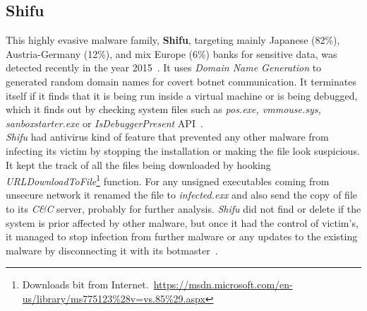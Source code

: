 \subsection{Shifu}
\label{sub:Shifu}
This highly evasive malware family, \textbf{Shifu}, targeting mainly Japanese (82\%), Austria-Germany (12\%), and mix Europe (6\%) banks for sensitive data, was detected recently in the year 2015~\cite[]{secintelshifu}.
It uses \emph{Domain Name Generation} to generated random domain names for covert botnet communication.
It terminates itself if it finds that it is being run inside a virtual machine or is being debugged, which it finds out by checking system files such as \emph{pos.exe, vmmouse.sys, sanboxstarter.exe} or \emph{IsDebuggerPresent} API~\cite[]{mccafeshifu}.\\
\emph{Shifu} had antivirus kind of feature that prevented any other malware from infecting its victim by stopping the installation or making the file look suspicious.
It kept the track of all the files being downloaded by hooking \textit{URLDownloadToFile}\footnote{Downloads bit from Internet.\ \url{https://msdn.microsoft.com/en-us/library/ms775123\%28v=vs.85\%29.aspx}} function.
For any unsigned executables coming from unsecure network it renamed the file to \emph{infected.exx} and also send the copy of file to its \emph{C\&C} server, probably for further analysis.
\emph{Shifu} did not find or delete if the system is prior affected by other malware, but once it had the control of victim's, it managed to stop infection from further malware or any updates to the existing malware by disconnecting it with its botmaster~\cite[]{secintelshifu}.
